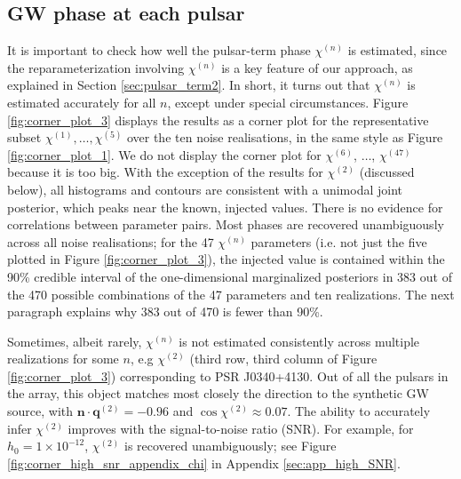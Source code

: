 \documentclass[fleqn,usenatbib,useAMS]{mnras}
\begin{document}
\subsection{GW phase at each pulsar} \label{sec:chi_estim}
It is important to check how well the pulsar-term phase $\chi^{(n)}$ is estimated, since the reparameterization involving $\chi^{(n)}$ is a key feature of our approach, as explained in Section \ref{sec:pulsar_term2}. In short, it turns out that $\chi^{(n)}$ is estimated accurately for all $n$, except under special circumstances. Figure \ref{fig:corner_plot_3} displays the results as a corner plot for the representative subset $\chi^{(1)}, \dots, \chi^{(5)}$ over the ten noise realisations, in the same style as Figure \ref{fig:corner_plot_1}. We do not display the corner plot for $\chi^{(6)}$, $\dots$, $\chi^{(47)}$ because it is too big. With the exception of the results for $\chi^{(2)}$ (discussed below), all histograms and contours are consistent with a unimodal joint posterior, which peaks near the known, injected values. There is no evidence for correlations between parameter pairs. Most phases are recovered unambiguously across all noise realisations; for the 47 $\chi^{(n)}$ parameters (i.e. not just the five plotted in Figure \ref{fig:corner_plot_3}), the injected value is  contained within the 90\% credible interval of the one-dimensional marginalized posteriors in 383 out of the 470 possible combinations of the 47 parameters and ten realizations. The next paragraph explains why 383 out of 470 is fewer than 90\%. \newline 

Sometimes, albeit rarely, $\chi^{(n)}$ is not estimated consistently across multiple realizations for some $n$, e.g $\chi^{(2)}$ (third row, third column of Figure \ref{fig:corner_plot_3}) corresponding to PSR J0340+4130. Out of all the pulsars in the array, this object matches most closely the direction to the synthetic GW source, with $\boldsymbol{n} \cdot \boldsymbol{q}^{(2)} = -0.96$ and $\cos \chi^{(2)} \approx 0.07$. The ability to accurately infer $\chi^{(2)}$ improves with the signal-to-noise ratio (SNR). For example, for $h_0 = 1 \times 10^{-12}$, $\chi^{(2)}$ is recovered unambiguously; see Figure \ref{fig:corner_high_snr_appendix_chi} in Appendix \ref{sec:app_high_SNR}. \newline 
\end{document}

